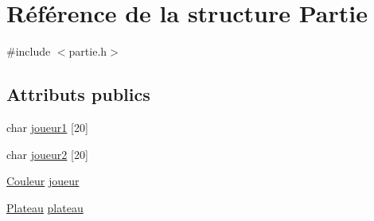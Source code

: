 \hypertarget{structPartie}{\section{\-Référence de la structure \-Partie}
\label{structPartie}
}


{\ttfamily \#include $<$partie.\-h$>$}

\subsection*{\-Attributs publics}
\begin{DoxyCompactItemize}
\item 
char \hyperlink{structPartie_a42905bbdce5ccfd367a1b4195a433e01}{joueur1} \mbox{[}20\mbox{]}
\item 
char \hyperlink{structPartie_a90dd0f2162050b2f3169dcb860d975cf}{joueur2} \mbox{[}20\mbox{]}
\item 
\hyperlink{couleur_8h_ae253e1bdbff71a044d939ee96ba0814a}{\-Couleur} \hyperlink{structPartie_a8b5c0c007da53d6d723f4300a1d9d4ad}{joueur}
\item 
\hyperlink{plateau_8h_a2f8eb6e8895bd97048918153353c99ac}{\-Plateau} \hyperlink{structPartie_ae8a9b67f286f8bfd3e3a574f0ac2ac67}{plateau}
\end{DoxyCompactItemize}


